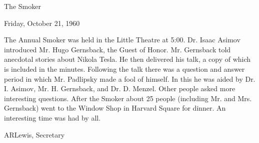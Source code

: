 \documentclass[12pt]{article}
\begin{document}
\begin{center}

The Smoker

Friday, October 21, 1960

\end{center}
 
\vspace{12pt}

\setlength{\parskip}{6pt}

\noindent
The Annual Smoker was held in the Little Theatre at 5:00. Dr. Isaac Asimov introduced Mr. Hugo Gernsback, the Guest of Honor. Mr. Gernsback told anecdotal stories about Nikola Tesla. He then delivered his talk, a copy of which is included in the minutes. Following the talk there was a question and answer period in which Mr. Padlipsky made a fool of himself. In this he was aided by Dr. I. Asimov, Mr. H. Gernsback, and Dr. D. Menzel. Other people asked more interesting questions. After the Smoker about 25 people (including Mr. and Mrs. Gernsback) went to the Window Shop in Harvard Square for dinner. An interesting time was had by all.

\vspace{12pt}

\centerline{ARLewis, Secretary}
\end{document}
